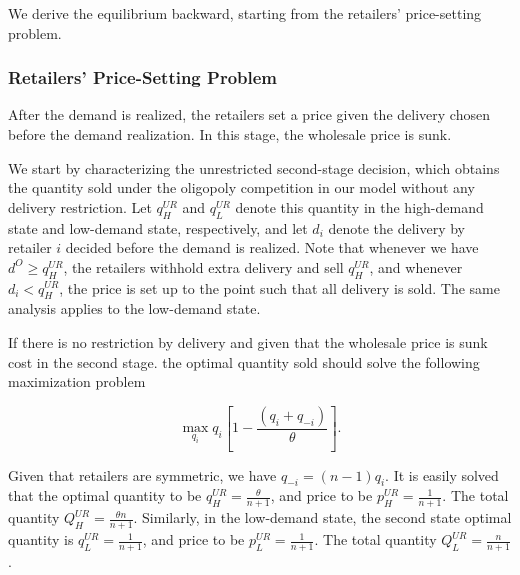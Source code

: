 \documentclass[12pt]{article}
\begin{document}
We derive the equilibrium backward, starting from the retailers' price-setting problem.


\subsubsection{Retailers' Price-Setting Problem}\label{sec:retailer_price_setting}
After the demand is realized, the retailers set a price given the delivery chosen before the demand realization. In this stage, the wholesale price is sunk. 

We start by characterizing the unrestricted second-stage decision, which obtains the quantity sold under the oligopoly competition in our model without any delivery restriction. Let $q_{H}^{UR}$ and $q_{L}^{UR}$ denote this quantity in the high-demand state and low-demand state, respectively, and let $d_i$ denote the delivery by retailer $i$ decided before the demand is realized. Note that whenever we have $d^{O} \geq q_{H}^{UR}$, the retailers withhold extra delivery and sell $q_{H}^{UR}$, and whenever $d_i < q_{H}^{UR}$, the price is set up to the point such that all delivery is sold. The same analysis applies to the low-demand state.


If there is no restriction by delivery and given that the wholesale price is sunk cost in the second stage. the optimal quantity sold should solve the following maximization problem

\begin{equation}
\max_{q_i} q_i\left[1 -\frac{(q_i + q_{-i})}{\theta}\right].
\end{equation}

Given that retailers are symmetric, we have $q_{-i} = (n - 1)q_{i}$. It is easily solved that the optimal quantity to be $q_{H}^{UR} = \frac{\theta}{n + 1}$, and price to be $p_{H}^{UR} = \frac{1}{n+1}$. The total quantity $Q_{H}^{UR} = \frac{\theta n}{n + 1}$. Similarly, in the low-demand state, the second state optimal quantity is 
 $q_{L}^{UR} = \frac{1}{n + 1}$, and price to be $p_{L}^{UR} = \frac{1}{n+1}$. The total quantity $Q_{L}^{UR} = \frac{n}{n + 1}$.

\end{document}
